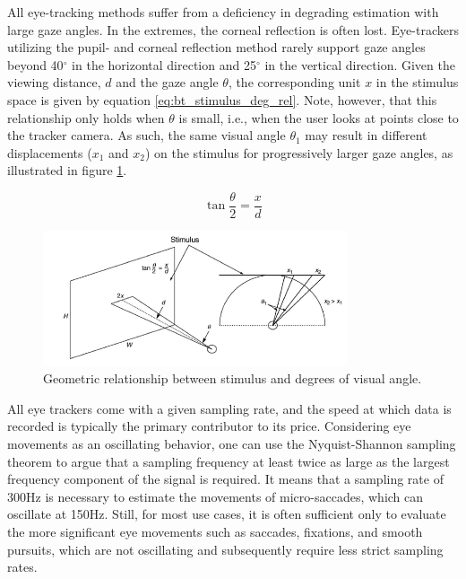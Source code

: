 All eye-tracking methods suffer from a deficiency in degrading estimation with large gaze angles. In the extremes, the corneal reflection is often lost. Eye-trackers utilizing the pupil- and corneal reflection method rarely support gaze angles beyond 40$^{\circ}$ in the horizontal direction and 25$^{\circ}$ in the vertical direction. Given the viewing distance, $d$ and the gaze angle $\theta$, the corresponding unit $x$ in the stimulus space is given by equation \ref{eq:bt_stimulus_deg_rel}. Note, however, that this relationship only holds when $\theta$ is small, i.e., when the user looks at points close to the tracker camera. As such, the same visual angle $\theta_1$ may result in different displacements ($x_1$ and $x_2$) on the stimulus for progressively larger gaze angles, as illustrated in figure \ref{fig:bt_stimulus_deg_rel}.

\begin{equation}
    \tan{\dfrac{\theta}{2}} = \dfrac{x}{d}
    \label{eq:bt_stimulus_deg_rel}
\end{equation}


\begin{figure}[h]
    \centering
    \includegraphics[width=0.8\textwidth]{figures/bt_angle_stimulus_relationship.png}
    \caption{Geometric relationship between stimulus and degrees of visual angle.}
    \label{fig:bt_stimulus_deg_rel}
\end{figure}

All eye trackers come with a given sampling rate, and the speed at which data is recorded is typically the primary contributor to its price. Considering eye movements as an oscillating behavior, one can use the Nyquist-Shannon sampling theorem to argue that a sampling frequency at least twice as large as the largest frequency component of the signal is required. It means that a sampling rate of 300Hz is necessary to estimate the movements of micro-saccades, which can oscillate at 150Hz. Still, for most use cases, it is often sufficient only to evaluate the more significant eye movements such as saccades, fixations, and smooth pursuits, which are not oscillating and subsequently require less strict sampling rates. 




